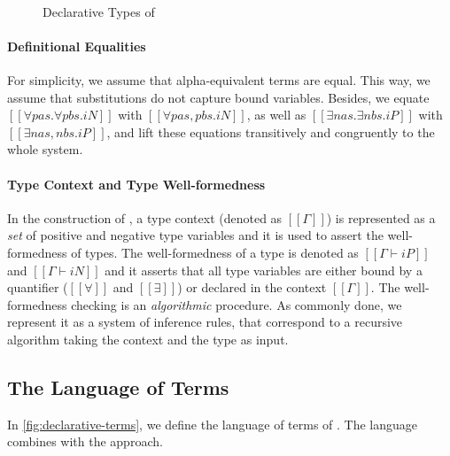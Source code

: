 \begin{figure}[h]
  \begin{multicols}{2}
    \ottgrammartabular{
      \ottiN\ottinterrule
    }\\
    \ottgrammartabular{
      \ottiP\ottinterrule
    }
    \columnbreak
  \end{multicols}
  \caption{Declarative Types of \fexists}
  \label{fig:declarative-types}
\end{figure}

\paragraph{Definitional Equalities}
For simplicity, we assume that alpha-equivalent terms are equal.
This way, we assume that substitutions do not capture bound variables.
Besides, we equate
$[[∀pas.∀pbs.iN]]$ with $[[∀pas,pbs.iN]]$, 
as well as $[[∃nas.∃nbs.iP]]$ with $[[∃nas,nbs.iP]]$,
and lift these equations transitively and congruently 
to the whole system.

\paragraph{Type Context and Type Well-formedness}

In the construction of \fexists, a type context (denoted as $[[Γ]]$) is
represented as a \emph{set} of positive and negative type variables and it is used to
assert the well-formedness of types. The well-formedness of a type is denoted as
$[[Γ ⊢ iP]]$ and $[[Γ ⊢ iN]]$ and it asserts that all type variables are either
bound by a quantifier ($[[∀]]$ and $[[∃]]$) or declared in the context $[[Γ]]$.
The well-formedness checking is an \emph{algorithmic} procedure. As commonly
done, we represent it as a system of inference rules, that correspond to a
recursive algorithm taking the context and the type as input. 

\subsection{The Language of Terms}

In \cref{fig:declarative-terms}, we define the language of terms of 
\fexists. The language combines \systemf with the \CBPV approach.

